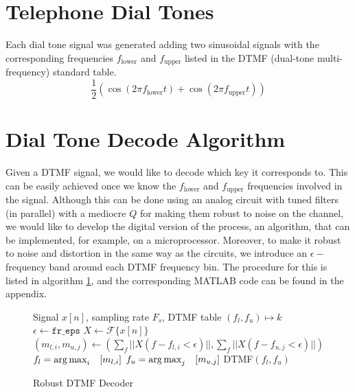 \documentclass[10pt]{article}
\begin{document}
\section{Telephone Dial Tones}
Each dial tone signal was generated adding two sinusoidal signals with the corresponding frequencies $f_\text{lower}$ and $f_\text{upper}$ listed in the DTMF (dual-tone multi-frequency) standard table.
\[
    \frac{1}{2}(\cos(2\pi f_\text{lower}t) + \cos(2\pi f_\text{upper}t))
\]

\section{Dial Tone Decode Algorithm}
Given a DTMF signal, we would like to decode which key it corresponds to. This can be easily achieved once we know the $f_\text{lower}$ and $f_\text{upper}$ frequencies involved in the signal. Although this can be done using an analog circuit with tuned filters (in parallel) with a mediocre $Q$ for making them robust to noise on the channel, we would like to develop the digital version of the process, an algorithm, that can be implemented, for example, on a microprocessor. Moreover, to  make it robust to noise and distortion in the same way as the circuits, we introduce an $\epsilon -$frequency band around each DTMF frequency bin. The procedure for this is listed in algorithm \ref{alg:dtmf_decode_algorithm}, and the corresponding \textsc{MATLAB} code can be found in the appendix.

\begin{figure}[ht]
  \centering
  \begin{minipage}{.64\linewidth}
        \begin{algorithm}[H]
            \caption{Robust DTMF Decoder}
            \label{alg:dtmf_decode_algorithm}
            \begin{algorithmic}
                \Require Signal $x[n]$, sampling rate $F_s$, DTMF table $(f_l, f_u) \mapsto k$
                \State $\epsilon \gets \texttt{fr\_eps}$
                \State $X \gets \mathcal{F}\{x[n]\}$ 
                    \State $(m_{l, i},m_{u, j}) \gets \left(\sum_f||X(f-f_{l,i} < \epsilon)||, \sum_f||X(f-f_{u,j} < \epsilon)||\right)$
                \EndFor
                \State $f_l = \operatorname*{arg\,max}_i \quad [m_{l, i}]$  
                \State $f_u = \operatorname*{arg\,max}_j \quad [m_{u, j}]$
                \State \Return DTMF$(f_l, f_u)$ 
            \end{algorithmic}
        \end{algorithm}
    \end{minipage}
\end{figure}
\end{document}
